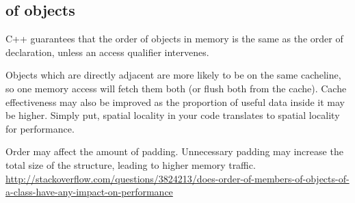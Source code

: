 \subsection{of objects}
\label{sec:overhead-of-order-of-declaration-objects-in-a-function}


C++ guarantees that the order of objects in memory is the same as the order of
declaration, unless an access qualifier intervenes.

Objects which are directly adjacent are more likely to be on the same cacheline,
so one memory access will fetch them both (or flush both from the cache). Cache
effectiveness may also be improved as the proportion of useful data inside it
may be higher. Simply put, spatial locality in your code translates to spatial
locality for performance.


Order may affect the amount of padding.  Unnecessary padding may increase the
total size of the structure, leading to higher memory traffic.
\url{http://stackoverflow.com/questions/3824213/does-order-of-members-of-objects-of-a-class-have-any-impact-on-performance}



